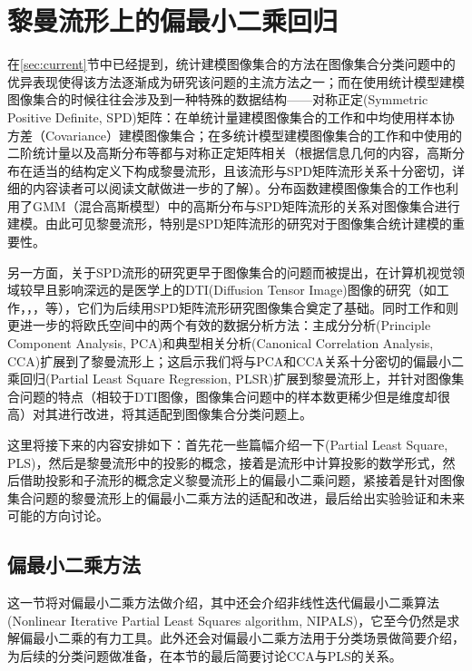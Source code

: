 \chapter{黎曼流形上的偏最小二乘回归}
\label{cha:rpls}
在\ref{sec:current}节中已经提到，统计建模图像集合的方法在图像集合分类问题中的优异表现使得该方法逐渐成为研究该问题的主流方法之一；而在使用统计模型建模图像集合的时候往往会涉及到一种特殊的数据结构——对称正定(Symmetric Positive Definite, SPD)矩阵：在单统计量建模图像集合的工作\cite{Statistics_CDL}和\cite{Statistics_SPDML}中均使用样本协方差（Covariance）建模图像集合；在多统计模型建模图像集合的工作\cite{Statistics_LMKML}和\cite{Statistics_HERML}中使用的二阶统计量以及高斯分布等都与对称正定矩阵相关（根据信息几何的内容\cite{Information_geometry}，高斯分布在适当的结构定义下构成黎曼流形，且该流形与SPD矩阵流形关系十分密切，详细的内容读者可以阅读文献\cite{Information_geometry}做进一步的了解）。分布函数建模图像集合的工作\cite{Statistics_DARG}也利用了GMM（混合高斯模型）中的高斯分布与SPD矩阵流形的关系对图像集合进行建模。由此可见黎曼流形，特别是SPD矩阵流形的研究对于图像集合统计建模的重要性。

另一方面，关于SPD流形的研究更早于图像集合的问题而被提出，在计算机视觉领域较早且影响深远的是医学上的DTI(Diffusion Tensor Image)图像的研究（如工作\cite{AIM_metric}，\cite{LEM_metric}，\cite{PGA}，\cite{RCCA}等），它们为后续用SPD矩阵流形研究图像集合奠定了基础。同时工作\cite{PGA}和\cite{RCCA}则更进一步的将欧氏空间中的两个有效的数据分析方法：主成分分析(Principle Component Analysis, PCA)和典型相关分析(Canonical Correlation Analysis, CCA)扩展到了黎曼流形上；这启示我们将与PCA和CCA关系十分密切的偏最小二乘回归(Partial Least Square Regression, PLSR)扩展到黎曼流形上，并针对图像集合问题的特点（相较于DTI图像，图像集合问题中的样本数更稀少但是维度却很高）对其进行改进，将其适配到图像集合分类问题上。

这里将接下来的内容安排如下：首先花一些篇幅介绍一下(Partial Least Square, PLS)，然后是黎曼流形中的投影的概念，接着是流形中计算投影的数学形式，然后借助投影和子流形的概念定义黎曼流形上的偏最小二乘问题，紧接着是针对图像集合问题的黎曼流形上的偏最小二乘方法的适配和改进，最后给出实验验证和未来可能的方向讨论。

\section{偏最小二乘方法}
\label{sec:plsr}
这一节将对偏最小二乘方法做介绍，其中还会介绍非线性迭代偏最小二乘算法(Nonlinear Iterative Partial Least Squares algorithm, NIPALS\cite{pls_NIPALS})，它至今仍然是求解偏最小二乘的有力工具。此外还会对偏最小二乘方法用于分类场景做简要介绍，为后续的分类问题做准备，在本节的最后简要讨论CCA与PLS的关系。

